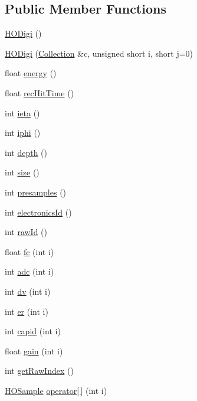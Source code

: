 \subsection*{Public Member Functions}
\begin{DoxyCompactItemize}
\item 
\hyperlink{class_h_o_digi_adecf47054ae80a541c0bdac2a9f6207c}{H\+O\+Digi} ()
\item 
\hyperlink{class_h_o_digi_acf11a0e7224d491cc6461a056112bd2d}{H\+O\+Digi} (\hyperlink{class_collection}{Collection} \&c, unsigned short i, short j=0)
\item 
float \hyperlink{class_h_o_digi_a35507a821e8d2c511366d8ace55498e8}{energy} ()
\item 
float \hyperlink{class_h_o_digi_a838e14ae5420e4e8dc3666e1db6e88e4}{rec\+Hit\+Time} ()
\item 
int \hyperlink{class_h_o_digi_ade1d1693acbf00a041202f4077bc1b01}{ieta} ()
\item 
int \hyperlink{class_h_o_digi_a45538b8564e47fdfb4fa1f7b7b3638aa}{iphi} ()
\item 
int \hyperlink{class_h_o_digi_a9c7b71e89e76c571f222af1a994738f9}{depth} ()
\item 
int \hyperlink{class_h_o_digi_a4d7d71ce07087f9dcca70ef861ba1695}{size} ()
\item 
int \hyperlink{class_h_o_digi_a3f43041b8f83de05dd047a1174aef8c9}{presamples} ()
\item 
int \hyperlink{class_h_o_digi_ac26e1e5c799189bf1b75ab7d84693f04}{electronics\+Id} ()
\item 
int \hyperlink{class_h_o_digi_ad4db205e282e97906270b2277619431d}{raw\+Id} ()
\item 
float \hyperlink{class_h_o_digi_a56032f0b01bee6c79b9e22ff442b1226}{fc} (int i)
\item 
int \hyperlink{class_h_o_digi_a3e6b23ebca7eb32e5bc88176714e70c0}{adc} (int i)
\item 
int \hyperlink{class_h_o_digi_aa4ec10e56cab21dc97f357a613c6ac37}{dv} (int i)
\item 
int \hyperlink{class_h_o_digi_a7049efa78a9b03d356f0e25493c48de5}{er} (int i)
\item 
int \hyperlink{class_h_o_digi_a8058b129b0df409e8055506caae9b6e4}{capid} (int i)
\item 
float \hyperlink{class_h_o_digi_a02e8e6616c14c5f624d5d52a7fd10b7b}{gain} (int i)
\item 
int \hyperlink{class_h_o_digi_ac3a7701fee9cd02ee000ebab0e140a3d}{get\+Raw\+Index} ()
\item 
\hyperlink{class_h_o_sample}{H\+O\+Sample} \hyperlink{class_h_o_digi_a8b844b107f103dc2d7950f82734ad885}{operator\mbox{[}$\,$\mbox{]}} (int i)
\end{DoxyCompactItemize}
